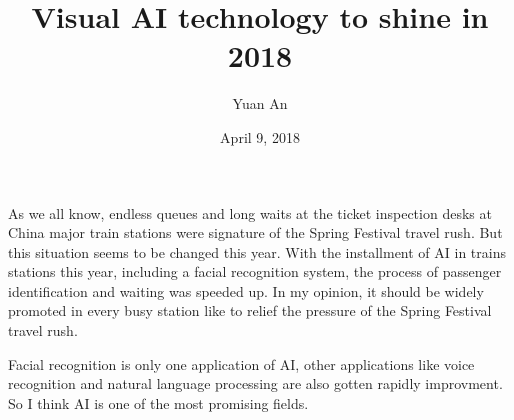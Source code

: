 \documentclass[a4paper,12pt]{article}
\begin{document}
\title{Visual AI technology to shine in 2018}
\author{Yuan An}
\date{April 9, 2018}
\maketitle
As we all know, endless queues and long waits at the ticket inspection desks at China major train stations were signature of the Spring Festival travel rush. But this situation seems to be changed this year. With the installment of AI in trains stations this year, including a facial recognition system, the process of passenger identification and waiting was speeded up. In my opinion, it should be widely promoted in every busy station like to relief the pressure of the Spring Festival travel rush. 
\par
Facial recognition is only one application of AI, other applications like voice recognition and natural language processing are also gotten rapidly improvment. So I think AI is one of the most promising fields.  
\end{document}
